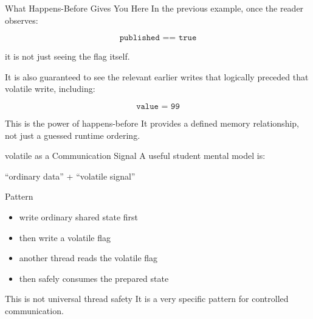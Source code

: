 \documentclass[aspectratio=169,11pt]{beamer}
\begin{document}
	\begin{frame}{What Happens-Before Gives You Here}
		In the previous example, once the reader observes:
		
		\[
		\texttt{published == true}
		\]
		
		it is not just seeing the flag itself.
		
		\vspace{0.3cm}
		
		It is also guaranteed to see the relevant earlier writes that logically preceded that volatile write, including:
		
		\[
		\texttt{value = 99}
		\]
		
		\vspace{0.3cm}
		
		\begin{alertblock}{This is the power of happens-before}
			It provides a defined memory relationship, not just a guessed runtime ordering.
		\end{alertblock}
	\end{frame}
	
	\begin{frame}{volatile as a Communication Signal}
		A useful student mental model is:
		
		\begin{center}
			\Large
			``ordinary data'' + ``volatile signal''
		\end{center}
		
		\vspace{0.3cm}
		
		\begin{exampleblock}{Pattern}
			\begin{itemize}
				\item write ordinary shared state first
				\item then write a volatile flag
				\item another thread reads the volatile flag
				\item then safely consumes the prepared state
			\end{itemize}
		\end{exampleblock}
		
		\vspace{0.3cm}
		
		\begin{block}{This is not universal thread safety}
			It is a very specific pattern for controlled communication.
		\end{block}
	\end{frame}
	
\end{document}
